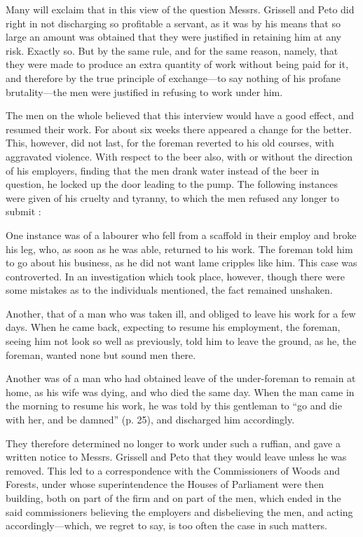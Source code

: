 Many will exclaim that in this view of the question Messrs. Grissell and
Peto did right in not discharging so profitable a servant, as it was by
his means that so large an amount was obtained that they were justified
in retaining him at any risk. Exactly so. But by the same rule, and for
the same reason, namely, that they were made to produce an extra
quantity of work without being paid for it, and therefore by the true
principle of exchange---to say nothing of his profane brutality---the
men were justified in refusing to work under him.

The men on the whole believed that this interview would have a good
effect, and resumed their work. For about six weeks there appeared a
change for the better. This, however, did not last, for the foreman
reverted to his old courses, with aggravated violence. With respect to
the beer also, with or without the direction of his employers, finding
that the men drank water instead of the beer in question, he locked up
the door leading to the pump. The following instances were given of his
cruelty and tyranny, to which the men refused any longer to submit :

One instance was of a labourer who fell from a scaffold in their employ
and broke his leg, who, as soon as he was able, returned to his work.
The foreman told him to go about his business, as he did not want lame
cripples like him. This case was controverted. In an investigation which
took place, however, though there were some mistakes as to the
individuals mentioned, the fact remained unshaken.

Another, that of a man who was taken ill, and obliged to leave his work
for a few days. When he came back, expecting to resume his employment,
the foreman, seeing him not look so well as previously, told him to
leave the ground, as he, the foreman, wanted none but sound men there.

Another was of a man who had obtained leave of the under-foreman to
remain at home, as his wife was dying, and who died the same day. When
the man came in the morning to resume his work, he was told by this
gentleman to ``go and die with her, and be damned'' (p. 25), and
discharged him accordingly.

They therefore determined no longer to work under such a ruffian, and
gave a written notice to Messrs. Grissell and Peto that they would leave
unless he was removed. This led to a correspondence with the
Commissioners of Woods and Forests, under whose superintendence the
Houses of Parliament were then building, both on part of the firm and on
part of the men, which ended in the said commissioners believing the
employers and disbelieving the men, and acting accordingly---which, we
regret to say, is too often the case in such matters.

